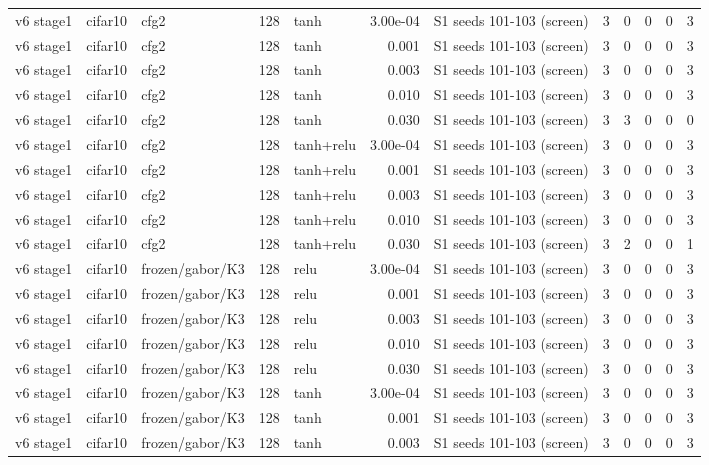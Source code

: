 \begin{table}[htbp]
{\begin{tabular}{@{}lllrlrlrrrrr@{}}
v6 stage1 & cifar10 & cfg2 & 128 & tanh & 3.00e-04 & S1 seeds 101-103 (screen) & 3 & 0 & 0 & 0 & 3 \\
v6 stage1 & cifar10 & cfg2 & 128 & tanh & 0.001 & S1 seeds 101-103 (screen) & 3 & 0 & 0 & 0 & 3 \\
v6 stage1 & cifar10 & cfg2 & 128 & tanh & 0.003 & S1 seeds 101-103 (screen) & 3 & 0 & 0 & 0 & 3 \\
v6 stage1 & cifar10 & cfg2 & 128 & tanh & 0.010 & S1 seeds 101-103 (screen) & 3 & 0 & 0 & 0 & 3 \\
v6 stage1 & cifar10 & cfg2 & 128 & tanh & 0.030 & S1 seeds 101-103 (screen) & 3 & 3 & 0 & 0 & 0 \\
v6 stage1 & cifar10 & cfg2 & 128 & tanh+relu & 3.00e-04 & S1 seeds 101-103 (screen) & 3 & 0 & 0 & 0 & 3 \\
v6 stage1 & cifar10 & cfg2 & 128 & tanh+relu & 0.001 & S1 seeds 101-103 (screen) & 3 & 0 & 0 & 0 & 3 \\
v6 stage1 & cifar10 & cfg2 & 128 & tanh+relu & 0.003 & S1 seeds 101-103 (screen) & 3 & 0 & 0 & 0 & 3 \\
v6 stage1 & cifar10 & cfg2 & 128 & tanh+relu & 0.010 & S1 seeds 101-103 (screen) & 3 & 0 & 0 & 0 & 3 \\
v6 stage1 & cifar10 & cfg2 & 128 & tanh+relu & 0.030 & S1 seeds 101-103 (screen) & 3 & 2 & 0 & 0 & 1 \\
v6 stage1 & cifar10 & frozen/gabor/K3 & 128 & relu & 3.00e-04 & S1 seeds 101-103 (screen) & 3 & 0 & 0 & 0 & 3 \\
v6 stage1 & cifar10 & frozen/gabor/K3 & 128 & relu & 0.001 & S1 seeds 101-103 (screen) & 3 & 0 & 0 & 0 & 3 \\
v6 stage1 & cifar10 & frozen/gabor/K3 & 128 & relu & 0.003 & S1 seeds 101-103 (screen) & 3 & 0 & 0 & 0 & 3 \\
v6 stage1 & cifar10 & frozen/gabor/K3 & 128 & relu & 0.010 & S1 seeds 101-103 (screen) & 3 & 0 & 0 & 0 & 3 \\
v6 stage1 & cifar10 & frozen/gabor/K3 & 128 & relu & 0.030 & S1 seeds 101-103 (screen) & 3 & 0 & 0 & 0 & 3 \\
v6 stage1 & cifar10 & frozen/gabor/K3 & 128 & tanh & 3.00e-04 & S1 seeds 101-103 (screen) & 3 & 0 & 0 & 0 & 3 \\
v6 stage1 & cifar10 & frozen/gabor/K3 & 128 & tanh & 0.001 & S1 seeds 101-103 (screen) & 3 & 0 & 0 & 0 & 3 \\
v6 stage1 & cifar10 & frozen/gabor/K3 & 128 & tanh & 0.003 & S1 seeds 101-103 (screen) & 3 & 0 & 0 & 0 & 3 \\

\end{tabular}}
\end{table}
